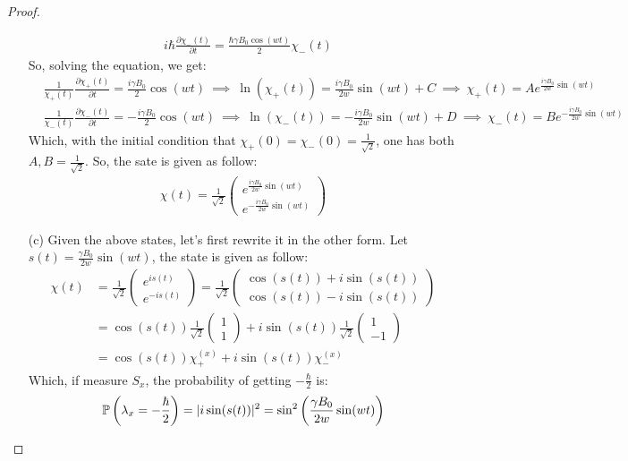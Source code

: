 \documentclass{article}
\begin{document}
\begin{proof}
\begin{itemize}
\begin{align}
            &i\hbar\frac{\partial\chi_-(t)}{\partial t} = \frac{\hbar\gamma B_0\cos(wt)}{2}\chi_-(t)
        \end{align}
        So, solving the equation, we get:
        \begin{align}
            &\frac{1}{\chi_+(t)}\frac{\partial\chi_+(t)}{\partial t} = \frac{i\gamma B_0}{2}\cos(wt)\ \implies\ \ln(\chi_+(t)) = \frac{i\gamma B_0}{2w}\sin(wt)+C\ \implies\ \chi_+(t) = Ae^{\frac{i\gamma B_0}{2w}\sin(wt)}\\
            &\frac{1}{\chi_-(t)}\frac{\partial\chi_-(t)}{\partial t}=-\frac{i\gamma B_0}{2}\cos(wt)\ \implies\ \ln(\chi_-(t))=-\frac{i\gamma B_0}{2w}\sin(wt)+D\ \implies\ \chi_-(t)=Be^{-\frac{i\gamma B_0}{2w}\sin(wt)}
        \end{align}
        Which, with the initial condition that $\chi_+(0)=\chi_-(0)=\frac{1}{\sqrt{2}}$, one has both $A,B = \frac{1}{\sqrt{2}}$. So, the sate is given as follow:
        \begin{align}
            \chi(t) = \frac{1}{\sqrt{2}}\begin{pmatrix}
                e^{\frac{i\gamma B_0}{2w}\sin(wt)}\\e^{-\frac{i\gamma B_0}{2w}\sin(wt)}
            \end{pmatrix}
        \end{align}
        
        \hfil

        \item[(c)] Given the above states, let's first rewrite it in the other form. Let $s(t) = \frac{\gamma B_0}{2w}\sin(wt)$, the state is given as follow:
        \begin{align}
            \chi(t) &= \frac{1}{\sqrt{2}}\begin{pmatrix}
                e^{is(t)}\\e^{-is(t)}
            \end{pmatrix} = \frac{1}{\sqrt{2}}\begin{pmatrix}
                \cos(s(t))+i\sin(s(t))\\\cos(s(t))-i\sin(s(t))
            \end{pmatrix}\\ 
            &= \cos(s(t))\frac{1}{\sqrt{2}}\begin{pmatrix}
                1\\1
            \end{pmatrix} + i\sin(s(t))\frac{1}{\sqrt{2}}\begin{pmatrix}
                1\\-1
            \end{pmatrix}\\
            &= \cos(s(t))\chi_+^{(x)} + i\sin(s(t))\chi_-^{(x)}
        \end{align}
        Which, if measure $S_x$, the probability of getting $-\frac{\hbar}{2}$ is:
        \begin{align}
            \mathbb{P}\left(\lambda_x = -\frac{\hbar}{2}\right) = |i\sin(s(t))|^2 = \sin^2\left(\frac{\gamma B_0}{2w}\sin(wt)\right)
        \end{align}


\end{itemize}
\end{proof}
\end{document}
